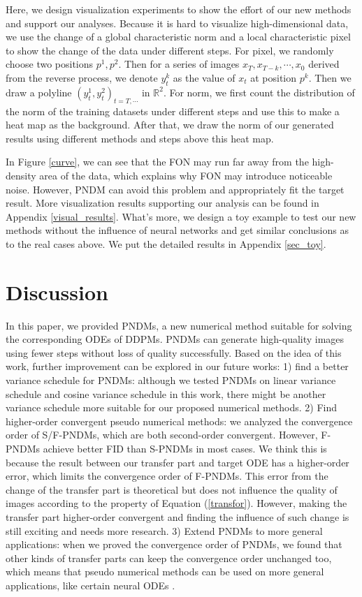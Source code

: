 \documentclass{article}
\begin{document}
Here, we design visualization experiments to show the effort of our new methods and support our analyses. Because it is hard to visualize high-dimensional data, we use the change of a global characteristic norm and a local characteristic pixel to show the change of the data under different steps. For pixel, we randomly choose two positions $p^1, p^2$. Then for a series of images $x_T, x_{T-k}, \cdots, x_0$ derived from the reverse process, we denote $y_t^k$ as the value of $x_t$ at position $p^k$. Then we draw a polyline $(y_t^1, y_t^2)_{t=T,\cdots}$ in $\mathbb{R}^2$. For norm, we first count the distribution of the norm of the training datasets under different steps and use this to make a heat map as the background. After that, we draw the norm of our generated results using different methods and steps above this heat map. 


In Figure \ref{curve}, we can see that the FON may run far away from the high-density area of the data, which explains why FON may introduce noticeable noise. However, PNDM can avoid this problem and appropriately fit the target result. More visualization results supporting our analysis can be found in Appendix \ref{visual_results}. What's more, we design a toy example to test our new methods without the influence of neural networks and get similar conclusions as to the real cases above. We put the detailed results in Appendix \ref{sec_toy}.

\section{Discussion}
\label{sec_disc}

In this paper, we provided PNDMs, a new numerical method suitable for solving the corresponding ODEs of DDPMs. PNDMs can generate high-quality images using fewer steps without loss of quality successfully. Based on the idea of this work, further improvement can be explored in our future works: 1) find a better variance schedule for PNDMs: although we tested PNDMs on linear variance schedule and cosine variance schedule in this work, there might be another variance schedule more suitable for our proposed numerical methods. 2) Find higher-order convergent pseudo numerical methods: we analyzed the convergence order of S/F-PNDMs, which are both second-order convergent. However, F-PNDMs achieve better FID than S-PNDMs in most cases. We think this is because the result between our transfer part and target ODE has a higher-order error, which limits the convergence order of F-PNDMs. This error from the change of the transfer part is theoretical but does not influence the quality of images according to the property of Equation (\ref{transfor}). 
However, making the transfer part higher-order convergent and finding the influence of such change is still exciting and needs more research. 3) Extend PNDMs to more general applications: when we proved the convergence order of PNDMs, we found that other kinds of transfer parts can keep the convergence order unchanged too, which means that pseudo numerical methods can be used on more general applications, like certain neural ODEs \citep{chen2019, dupont2019}. 
\end{document}
